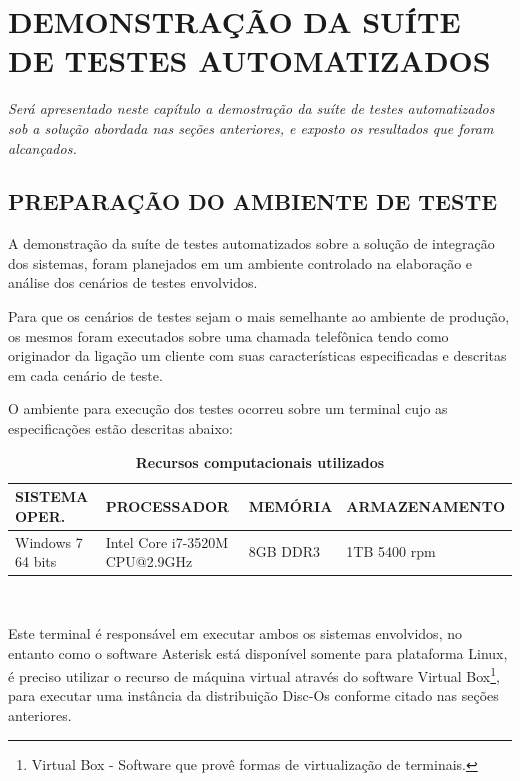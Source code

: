 \chapter[Demonstração da Suíte de Testes Automatizados]{\textbf{\uppercase{Demonstração da Suíte de Testes Automatizados}}}

\textit{Será apresentado neste capítulo a demostração da suíte de testes automatizados sob a solução abordada nas seções anteriores, e exposto os resultados que foram alcançados.}


\section{\uppercase{Preparação do Ambiente de teste}}

A demonstração da suíte de testes automatizados sobre a solução de integração dos sistemas, foram planejados em um ambiente controlado na elaboração e análise dos cenários de testes envolvidos. 

Para que os cenários de testes sejam o mais semelhante ao ambiente de produção, os mesmos foram executados sobre uma chamada telefônica tendo como originador da ligação um cliente com suas características especificadas e descritas em cada cenário de teste. 

O ambiente para execução dos testes ocorreu sobre um terminal cujo as especificações estão descritas abaixo:

\begin{table}[htb]
	\footnotesize
	\caption{\textbf{Recursos computacionais utilizados}}
	\label{tabela:recursosUtilizados}
	\begin{tabular}{|p{3.5cm}|p{3cm}|p{2cm}|p{4cm}|} \hline
		\textbf{SISTEMA OPER.} 	& \textbf{PROCESSADOR} 				& \textbf{MEMÓRIA} 	& \textbf{ARMAZENAMENTO}  \\ \hline
		Windows 7 64 bits 		& Intel Core i7-3520M CPU@2.9GHz 	& 8GB DDR3			& 1TB 5400 rpm \\ \hline
	\end{tabular}\\[6pt]
	\fontsize{10}{12}\selectfont {Fonte: Autoria Própria.}
\end{table}

Este terminal é responsável em executar ambos os sistemas envolvidos, no entanto como o software Asterisk está disponível somente para plataforma Linux, é preciso utilizar o recurso de máquina virtual através do software Virtual Box\footnote{Virtual Box - Software que provê formas de virtualização de terminais.}, para executar uma instância da distribuição Disc-Os conforme citado nas seções anteriores.
 
